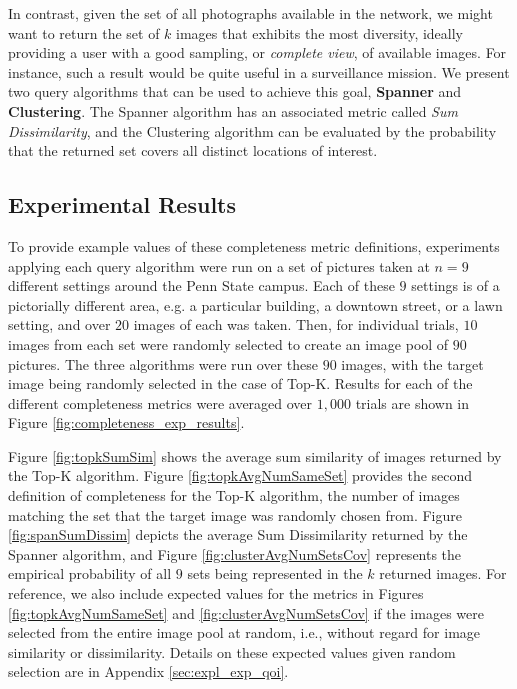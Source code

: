 In contrast, given the set of all photographs available in the network, we might want to return the set of $k$ images that exhibits the most diversity, ideally providing a user with a good sampling, or \emph{complete view}, of available images.  For instance, such a result would be quite useful in a surveillance mission.  We present two query algorithms that can be used to achieve this goal, {\bf Spanner} and {\bf Clustering}. The Spanner algorithm has an associated metric called \emph{Sum Dissimilarity}, and the Clustering algorithm can be evaluated by the probability that the returned set covers all distinct locations of interest. 

\subsection{Experimental Results}

To provide example values of these completeness metric definitions, experiments applying each query algorithm were run on a set of pictures taken at $n = 9$ different settings around the Penn State campus.  Each of these $9$ settings is of a pictorially different area, e.g. a particular building, a downtown street, or a lawn setting, and over $20$ images of each was taken.  Then, for individual trials, $10$ images from each set were randomly selected to create an image pool of $90$ pictures.  The three algorithms were run over these $90$ images, with the target image being randomly selected in the case of Top-K.  Results for each of the different completeness metrics were averaged over $1,000$ trials are shown in Figure \ref{fig:completeness_exp_results}. %

Figure \ref{fig:topkSumSim} shows the average sum similarity of images returned by the Top-K algorithm.  Figure \ref{fig:topkAvgNumSameSet} provides the second definition of completeness for the Top-K algorithm, the number of images matching the set that the target image was randomly chosen from.  
Figure \ref{fig:spanSumDissim} depicts the average Sum Dissimilarity returned by the Spanner algorithm, and Figure \ref{fig:clusterAvgNumSetsCov} represents the empirical probability of all $9$ sets being represented in the $k$ returned images.   For reference, we also include expected values for the metrics in Figures \ref{fig:topkAvgNumSameSet} and \ref{fig:clusterAvgNumSetsCov} if the images were selected from the entire image pool at random, i.e., without regard for image similarity or dissimilarity.  Details on these expected values given random selection are in Appendix \ref{sec:expl_exp_qoi}.

